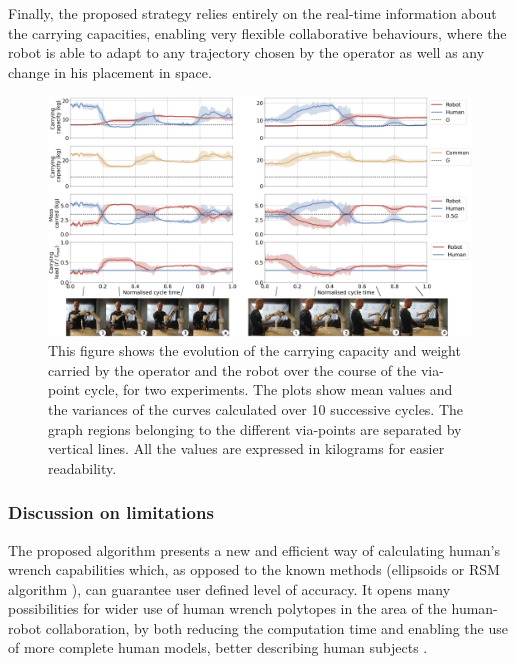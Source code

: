 Finally, the proposed strategy relies entirely on the real-time information about the carrying capacities, enabling very flexible collaborative behaviours, where the robot is able to adapt to any trajectory chosen by the operator as well as any change in his placement in space. 


\begin{landscape}
\begin{figure}[!t]
    \centering
    \includegraphics[width=\linewidth]{Papers/images/exp2_new.jpg}
    \caption{This figure shows the evolution of the carrying capacity and weight carried by the operator and the robot over the course of the via-point cycle, for two experiments. The plots show mean values and the variances of the curves calculated over 10 successive cycles. The graph regions belonging to the different via-points are separated by vertical lines.  All the values are expressed in kilograms for easier readability.}
    \label{fig:experiment_results}
\end{figure}
\end{landscape}

\subsubsection{Discussion on limitations}
\label{sec:human_robot_prospective}

The proposed algorithm presents a new and efficient way of calculating human's wrench capabilities which, as opposed to the known methods (ellipsoids \cite{yoshikawa1985manipulability}\cite{sasaki2011vertex} or RSM algorithm \cite{carmichael2011Towards}), can guarantee user defined level of accuracy. It opens many possibilities for wider use of human wrench polytopes in the area of the human-robot collaboration, by both reducing the computation time and enabling the use of more complete human models, better describing human subjects \cite{sohn2019effects}.

